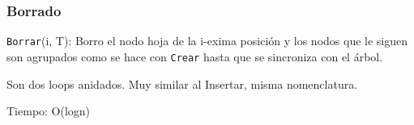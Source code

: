 \documentclass[10pt,handout]{beamer}
\begin{document}
\begin{frame}
{\begin{figure}[h!]
\end{figure}}
  \pause



\end{frame}



\begin{frame}
\frametitle{Borrado}
\texttt{Borrar}(i, T): Borro el nodo hoja de la i-exima posición y los nodos que le siguen son agrupados
  como se hace con  \texttt{Crear} hasta que se sincroniza con el árbol.

  Son dos loops anidados. Muy similar al Insertar, misma nomenclatura.

  Tiempo: O(logn)

\end{frame}
\end{document}
